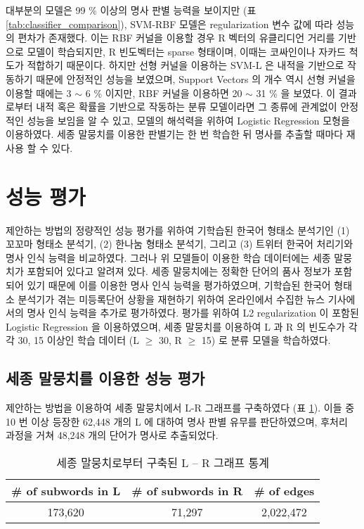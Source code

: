 \documentclass[oneside, ko,phd]{snuthesis_utf8_kor}
\begin{document}
대부분의 모델은 99 \% 이상의 명사 판별 능력을 보이지만 (표 \ref{tab:classifier_comparison}), SVM-RBF 모델은 regularization 변수 값에 따라 성능의 편차가 존재했다.
이는 RBF 커널을 이용할 경우 R 벡터의 유클리디언 거리를 기반으로 모델이 학습되지만, R 빈도벡터는 sparse 형태이며, 이때는 코싸인이나 자카드 척도가 적합하기 때문이다.
하지만 선형 커널을 이용하는 SVM-L 은 내적을 기반으로 작동하기 때문에 안정적인 성능을 보였으며, Support Vectors 의 개수 역시 선형 커널을 이용할 때에는 3 $\sim$ 6 \% 이지만, RBF 커널을 이용하면 20 $\sim$ 31 \%  을 보였다.
이 결과로부터 내적 혹은 확률을 기반으로 작동하는 분류 모델이라면 그 종류에 관계없이 안정적인 성능을 보임을 알 수 있고, 모델의 해석력을 위하여 Logistic Regression 모형을 이용하였다.
세종 말뭉치를 이용한 판별기는 한 번 학습한 뒤 명사를 추출할 때마다 재사용 할 수 있다.

\section{성능 평가}

제안하는 방법의 정량적인 성능 평가를 위하여 기학습된 한국어 형태소 분석기인 (1) 꼬꼬마 형태소 분석기, (2) 한나눔 형태소 분석기, 그리고 (3) 트위터 한국어 처리기와 명사 인식 능력을 비교하였다.
그러나 위 모델들이 이용한 학습 데이터에는 세종 말뭉치가 포함되어 있다고 알려져 있다.
세종 말뭉치에는 정확한 단어의 품사 정보가 포함되어 있기 때문에 이를 이용한 명사 인식 능력을 평가하였으며, 기학습된 한국어 형태소 분석기가 겪는 미등록단어 상황을 재현하기 위하여 온라인에서 수집한 뉴스 기사에서의 명사 인식 능력을 추가로 평가하였다.
평가를 위하여 L2 regularization 이 포함된 Logistic Regression 을 이용하였으며, 세종 말뭉치를 이용하여 L 과 R 의 빈도수가 각각 30, 15 이상인 학습 데이터 (L $\geq$ 30, R $\geq$ 15) 로 분류 모델을 학습하였다.

\subsection{세종 말뭉치를 이용한 성능 평가}

제안하는 방법을 이용하여 세종 말뭉치에서 L-R 그래프를 구축하였다 (표 \ref{tab:sejong_statistics}).
이들 중 10 번 이상 등장한 62,448 개의 L 에 대하여 명사 판별 유무를 판단하였으며, 후처리 과정을 거쳐 48,248 개의 단어가 명사로 추출되었다.

\begin{table}[ht]
\centering
\caption{세종 말뭉치로부터 구축된 L – R 그래프 통계}
\label{tab:sejong_statistics}
\begin{tabular}{|c|c|c|}
\hline
\# of subwords in L & \# of subwords in R & \# of edges \\ \hline
173,620 & 71,297 & 2,022,472   \\ \hline
\end{tabular}%
\end{table}
\end{document}

